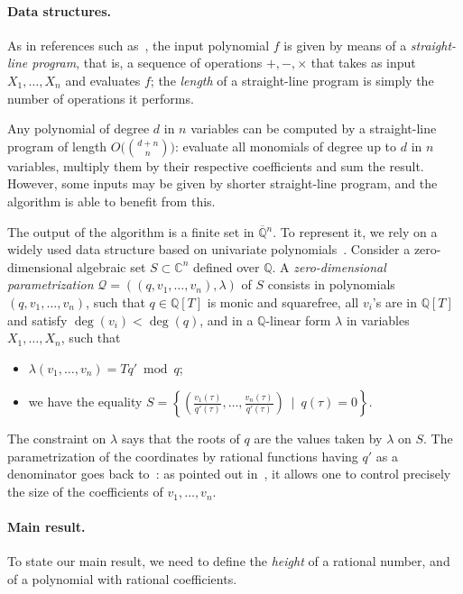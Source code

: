 \documentclass[sigconf]{acmart}
\def\C{\mathbb{C}}
\def\Q{\mathbb{Q}}
\def\scrQ{\ensuremath{\mathscr{Q}}}
\begin{document}
\paragraph*{Data structures.} As in references such
as~\cite{GiHeMoPa95,GiHaHeMoMoPa97,GiHeMoMoPa98,BaGiHeMb97,EMP}, the
input polynomial $f$ is given by means of a {\em straight-line
  program}, that is, a sequence of operations $+,-,\times$ that takes
as input $X_1,\dots,X_n$ and evaluates $f$; the {\em length} of a
straight-line program is simply the number of operations it performs.

Any polynomial of degree $d$ in $n$ variables can be computed by a
straight-line program of length $O\big ({{d+n} \choose n}\big)$:
evaluate all monomials of degree up to $d$ in $n$ variables, multiply
them by their respective coefficients and sum the result. However,
some inputs may be given by shorter straight-line program, and the
algorithm is able to benefit from this.

The output of the algorithm is a finite set in $\overline{\Q}{}^n$. To
represent it, we rely on a widely used data structure based on
univariate
polynomials~\cite{Kronecker82,Macaulay16,GiMo89,GiHeMoPa95,ABRW,GiHaHeMoMoPa97,GiHeMoMoPa98,Rouillier99}.
Consider a zero-dimensional algebraic set $S \subset \C^n$ defined
over $\Q$. A {\em zero-dimensional parametrization}
$\scrQ=((q,v_1,\dots,v_n),\lambda)$ of $S$ consists in polynomials
$(q,v_1,\dots,v_n)$, such that $q\in \Q[T]$ is monic and squarefree,
all $v_i$'s are in $\Q[T]$ and satisfy $\deg(v_i) < \deg(q)$, and in a
$\Q$-linear form $\lambda$ in variables $X_1,\dots,X_n$, such that
\begin{itemize}
\item $\lambda(v_1,\dots,v_n)=T q' \bmod q$;
\item we have the equality
  $S=\left \{\left(
      \frac{v_1(\tau)}{q'(\tau)},\dots,\frac{v_n(\tau)}{q'(\tau)}\right
    ) \ \mid \ q(\tau)=0 \right \}.$
\end{itemize}
The constraint on $\lambda$ says that the roots of $q$ are the values
taken by $\lambda$ on $S$. The parametrization of the coordinates by
rational functions having $q'$ as a denominator goes back
to~\cite{Kronecker82,Macaulay16}: as pointed out in~\cite{ABRW}, it
allows one to control precisely the size of the coefficients of
$v_1,\dots,v_n$.

\paragraph*{Main result.} To state our main result, we need to define 
the {\em height} of a rational number, and of a polynomial with
rational coefficients.
\end{document}
